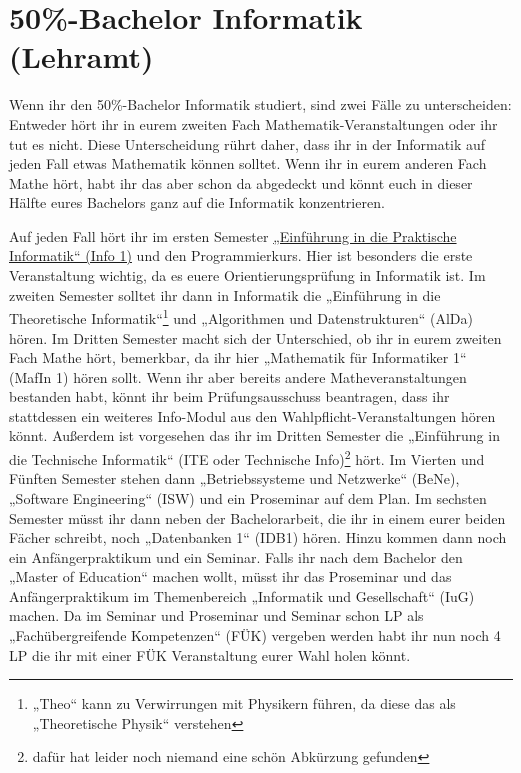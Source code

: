 \section{50\%-Bachelor Informatik (Lehramt)}

Wenn ihr den 50\%-Bachelor Informatik studiert, sind zwei Fälle zu unterscheiden: Entweder hört ihr in eurem zweiten Fach Ma\-the\-ma\-tik-Ver\-an\-stal\-tun\-gen oder ihr tut es nicht. Diese Unterscheidung rührt daher, dass ihr in der Informatik auf jeden Fall etwas Mathematik können solltet. Wenn ihr in eurem anderen Fach Mathe hört, habt ihr das aber schon da abgedeckt und könnt euch in dieser Hälfte eures Bachelors ganz auf die Informatik konzentrieren.

Auf jeden Fall hört ihr im ersten Semester \hyperref[info1]{„Einführung in die Praktische Informatik“ (Info 1)} und den Programmierkurs. Hier ist besonders die erste Veranstaltung wichtig, da es euere Orientierungsprüfung in Informatik ist. Im zweiten Semester solltet ihr dann in Informatik die „Einführung in die Theoretische Informatik“\footnote{„Theo“ kann zu Verwirrungen mit Physikern führen, da diese das als „Theoretische Physik“ verstehen} und „Algorithmen und Datenstrukturen“ (AlDa) hören. Im Dritten Semester macht sich der Unterschied, ob ihr in eurem zweiten Fach Mathe hört, bemerkbar, da ihr hier „Mathematik für Informatiker 1“ (MafIn 1) hören sollt. Wenn ihr aber bereits andere Matheveranstaltungen bestanden habt, könnt ihr beim Prüfungsausschuss beantragen, dass ihr stattdessen ein weiteres Info-Modul aus den Wahlpflicht-Veranstaltungen hören könnt. Außerdem ist vorgesehen das ihr im Dritten Semester die „Einführung in die Technische Informatik“ (ITE oder Technische Info)\footnote{dafür hat leider noch niemand eine schön Abkürzung gefunden} hört. Im Vierten und Fünften Semester stehen dann „Betriebssysteme und Netzwerke“ (BeNe), „Software Engineering“ (ISW) und ein Proseminar auf dem Plan. Im sechsten Semester müsst ihr dann neben der Bachelorarbeit, die ihr in einem eurer beiden Fächer schreibt, noch „Datenbanken 1“ (IDB1) hören. Hinzu kommen dann noch ein Anfängerpraktikum und ein Seminar. Falls ihr nach dem Bachelor den „Master of Education“ machen wollt, müsst ihr das Proseminar und das Anfängerpraktikum im Themenbereich „Informatik und Gesellschaft“ (IuG) machen. Da im Seminar und Proseminar und Seminar schon \gls{LP} als „Fachübergreifende Kompetenzen“ (FÜK) vergeben werden habt ihr nun noch 4 \gls{LP} die ihr mit einer FÜK Veranstaltung eurer Wahl holen könnt.

